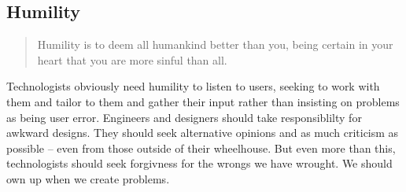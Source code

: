 \documentclass[letterpaper]{article}
\begin{document}




  \subsection{Humility}

    \begin{quote}
      Humility is to deem all humankind better than you, being certain in your heart that you are more sinful than all.
    \end{quote}

    Technologists obviously need humility to listen to users, seeking to work with them and tailor to them and gather their input rather than insisting on problems as being user error. Engineers and designers should take responsiblilty for awkward designs. They should seek alternative opinions and as much criticism as possible -- even from those outside of their wheelhouse. But even more than this, technologists should seek forgivness for the wrongs we have wrought. We should own up when we create problems.
\end{document}
